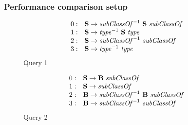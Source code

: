 \documentclass[xcolor=table,aspectratio=169]{beamer}
\begin{document}
\begin{frame}[fragile]
\transwipe[direction=90]
\frametitle{Performance comparison setup}
\begin{figure}[ht]
   \centering

   \[
\begin{array}{rl}
   0: & \textbf{S} \rightarrow \text{\textit{subClassOf}}^{-1} \ \textbf{S} \ \text{\textit{subClassOf}} \\ 
   1: & \textbf{S} \rightarrow \text{\textit{type}}^{-1} \ \textbf{S} \ \text{\textit{type}} \\ 
   2: & \textbf{S} \rightarrow \text{\textit{subClassOf}}^{-1} \ \text{\textit{subClassOf}} \\ 
   3: & \textbf{S} \rightarrow \text{\textit{type}}^{-1} \ \text{\textit{type}} \\ 
\end{array}
\]
   Query 1
   \end{figure}
\begin{figure}[h]%
   \centering

   \[
\begin{array}{rl}
   0: & \textbf{S} \rightarrow \textbf{B} \ \text{\textit{subClassOf}} \\ 
   1: & \textbf{S} \rightarrow \text{\textit{subClassOf}} \\ 
   2: & \textbf{B} \rightarrow \text{\textit{subClassOf}}^{-1} \ \textbf{B} \ \text{\textit{subClassOf}} \\
   3: & \textbf{B} \rightarrow \text{\textit{subClassOf}}^{-1} \ \text{\textit{subClassOf}} \\ 
\end{array}
\]
   Query 2

   \end{figure}

\end{frame}
\end{document}
